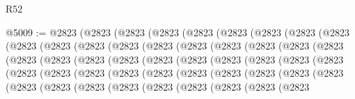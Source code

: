 \begin{lexlean}{R52}
\begin{coremodule}
{{{{{{{{{{{{{{{{{{{{{{{{{{{{{{{{{{{{{{{{{{{{{{{{{{{{{{{{{{{{{{{{{{{{{{{{{{{{{{{{{{{{{{{{{{{{{{{{{{{{{{{{{{{{{{{{{{{{{{{{{{{{{{{{{{{{{{{{{{{{{{{{{{{{{{{{{{{{{{{{{{{{{{{{{{{{{{{{{{{{{{{{{{{{{{{{{{{{{{@5009 := @2823
    (@2823
      (@2823
        (@2823
          (@2823
            (@2823
              (@2823
                (@2823
                  (@2823
                    (@2823
                      (@2823
                        (@2823
                          (@2823
                            (@2823
                              (@2823
                                (@2823
                                  (@2823
                                    (@2823
                                      (@2823
                                        (@2823
                                          (@2823
                                            (@2823
                                              (@2823
                                                (@2823
                                                  (@2823
                                                    (@2823
                                                      (@2823
                                                        (@2823
                                                          (@2823
                                                            (@2823
                                                              (@2823
                                                                (@2823
                                                                  (@2823
                                                                    (@2823
                                                                      (@2823
                                                                        (@2823
                                                                          (@2823
                                                                            (@2823
                                                                              (@2823
                                                                                (@2823
                                                                                  (@2823
                                                                                    (@2823
                                                                                      (@2823
                                                                                        (@2823
                                                                                          (@2823
                                                                                            (@2823
                                                                                              (@2823
                                                                                                (@2823
}}}}}}}}}}}}}}}}}}}}}}}}}}}}}}}}}}}}}}}}}}}}}}}}}}}}}}}}}}}}}}}}}}}}}}}}}}}}}}}}}}}}}}}}}}}}}}}}}}}}}}}}}}}}}}}}}}}}}}}}}}}}}}}}}}}}}}}}}}}}}}}}}}}}}}}}}}}}}}}}}}}}}}}}}}}}}}}}}}}}}}}}}}}}}}}}}}}}}}
\end{coremodule}
\end{lexlean}
